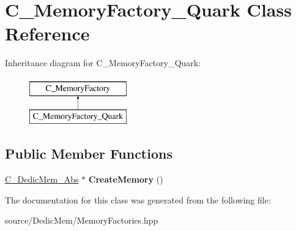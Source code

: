 \hypertarget{class_c___memory_factory___quark}{\section{C\-\_\-\-Memory\-Factory\-\_\-\-Quark Class Reference}
\label{class_c___memory_factory___quark}
}
Inheritance diagram for C\-\_\-\-Memory\-Factory\-\_\-\-Quark\-:\begin{figure}[H]
\begin{center}
\leavevmode
\includegraphics[height=2.000000cm]{class_c___memory_factory___quark}
\end{center}
\end{figure}
\subsection*{Public Member Functions}
\begin{DoxyCompactItemize}
\item 
\hypertarget{class_c___memory_factory___quark_acdd015023349f6658c14cd5f74d1806d}{\hyperlink{class_c___dedic_mem___abs}{C\-\_\-\-Dedic\-Mem\-\_\-\-Abs} $\ast$ {\bfseries Create\-Memory} ()}\label{class_c___memory_factory___quark_acdd015023349f6658c14cd5f74d1806d}

\end{DoxyCompactItemize}


The documentation for this class was generated from the following file\-:\begin{DoxyCompactItemize}
\item 
source/\-Dedic\-Mem/Memory\-Factories.\-hpp\end{DoxyCompactItemize}
